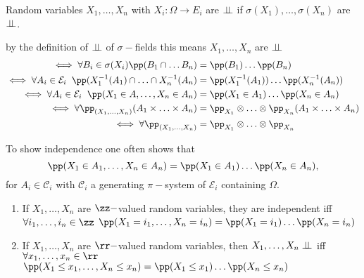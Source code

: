 \documentclass[../main.tex]{subfiles}
\begin{document}
\begin{definition}
  Random variables $X_1, \ldots, X_n$ with $X_i \colon \Omega \to E_i$ are $\perp\!\!\!\!\,\perp$ if
  $\sigma(X_1), \ldots, \sigma(X_n)$ are $\perp\!\!\!\!\,\perp$.
\end{definition}

\begin{remark}
    by the definition of $\perp\!\!\!\!\,\perp$ of $\sigma-$fields this means $X_1, \ldots, X_n$ are $\perp\!\!\!\!\,\perp$
    \begin{align*}
     \iff
    \forall B_i \in \sigma(X_i)\pp(B_1 \cap
    \ldots B_n) &= \pp(B_1) \ldots \pp(B_n) \\ 
    \iff
       \forall A_i \in \mathcal{E}_i \;\; \pp(X_1^{-1}(A_1) \cap \ldots
    \cap X_n^{-1}(A_n) &= \pp(X_1^{-1}(A_1)) \ldots \pp(X_n^{-1}(A_n)) \\
    \iff
    \forall A_i \in \mathcal{E}_i \;\;\pp(X_1 \in A, \ldots, X_n \in A_n) &= \pp(X_1 \in
    A_1)\ldots\pp(X_n \in A_n) \\
    \iff 
    \forall \pp_{(X_1, \ldots, X_n)}(A_1 \times \ldots \times A_n) &= \pp_{X_1} \otimes \ldots \otimes \pp_{X_n} (A_1 \times
    \ldots \times A_n) \\
    \iff 
    \forall \pp_{(X_1, \ldots, X_n)} &= \pp_{X_1} \otimes \ldots \otimes \pp_{X_n}
    \end{align*}
\end{remark}
\begin{remark}
    To show independence one often shows that
    \[
    \pp(X_1 \in A_1, \ldots, X_n \in A_n ) = \pp(X_1 \in A_1) \ldots \pp(X_n \in A_n)
    ,\] 
    for $A_i \in \mathcal{C}_i$ with $\mathcal{C}_i$ a generating $\pi-$system of
  $\mathcal{E}_i$ containing $\Omega$.
\end{remark}

\begin{corollary}
  \hfill
  \begin{enumerate}
    \item If $X_1, \ldots, X_n$ are $\zz-$valued random variables, they are independent iff
      $\forall i_1, \ldots, i_n \in \zz$ $\pp(X_1 = i_1, \ldots, X_n = i_n) = \pp(X_1 = i_1)
      \ldots \pp(X_n = i_n)$
    \item If $X_1, \ldots, X_n$ are $\rr-$valued random variables, then $X_1,\ldots, X_n
      \perp\!\!\!\!\,\perp$ iff $\forall x_1, \ldots, x_n \in \rr$ $\pp(X_1 \leq x_1, \ldots, X_n \leq x_n) =
      \pp(X_1 \leq x_1) \ldots \pp(X_n \leq x_n)$
  \end{enumerate}
\end{corollary}
\end{document}

